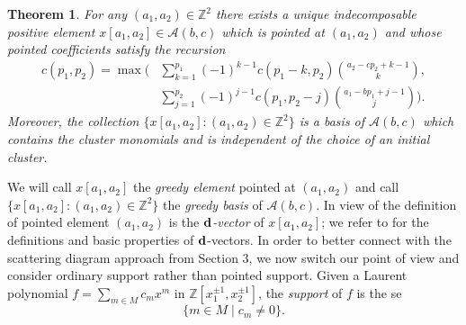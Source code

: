 \documentclass[11pt]{amsart}
\newtheorem{theorem}{Theorem}[section]
\theoremstyle{remark}
\numberwithin{equation}{section}
\newcommand{\ZZ}{\mathbb{Z}}
\newcommand{\cA}{\mathcal{A}}
\newcommand{\bfd}{{\bf d}}
\begin{document}
\begin{theorem}\label{th:greedy}\cite[Theorem~1.7]{LLZ}
  For any $(a_1,a_2)\in\ZZ^2$ there exists a unique indecomposable positive
  element $x[a_1,a_2]\in\cA(b,c)$ which is pointed at $(a_1,a_2)$ and whose
  pointed coefficients satisfy the recursion
  \begin{align}
    \label{eq:greedy recursion}
    c(p_1,p_2)=\max\bigg(
    &\sum\limits_{k=1}^{p_1} (-1)^{k-1}c(p_1-k,p_2){a_2-cp_2+k-1\choose k},\\
    \nonumber&\sum\limits_{ j =1}^{p_2} (-1)^{ j -1}c(p_1,p_2- j ){a_1-bp_1+ j -1\choose  j }\bigg).
  \end{align}
  Moreover, the collection $\{x[a_1,a_2]:(a_1,a_2)\in\ZZ^2\}$ is a basis of
  $\cA(b,c)$ which contains the cluster monomials and is independent of the
  choice of an initial cluster.
\end{theorem}
We will call $x[a_1,a_2]$ the \emph{greedy element} pointed at $(a_1,a_2)$ and
call $\{x[a_1,a_2]:(a_1,a_2)\in\ZZ^2\}$ the \emph{greedy basis} of $\cA(b,c)$. 
In view of the definition of pointed element $(a_1,a_2)$ is the
\emph{$\bfd$-vector} of $x[a_1,a_2]$; we refer to \cite{FZ4} for the
 definitions and basic properties of $\bfd$-vectors.
In order to better connect with the scattering diagram approach from Section 3, we now switch our point of view and consider ordinary support rather than pointed support.  Given a Laurent polynomial $f=\sum_{m\in M}c_mx^m$ in $\ZZ[x_1^{\pm1},x_2^{\pm1}]$, the \emph{support} of $f$ is the se
\[ \{m\in M \mid c_m\neq 0\}. \]
\end{document}
